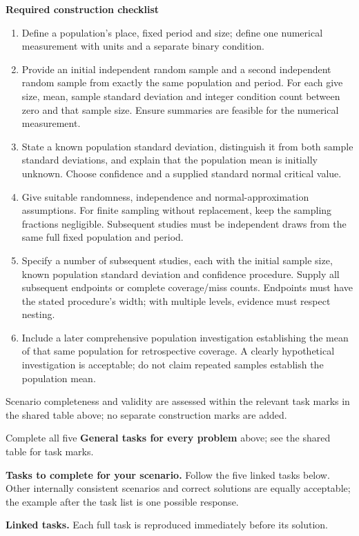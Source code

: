 \textbf{Required construction checklist}
\begin{enumerate}
\item Define a population's place, fixed period and size; define one numerical measurement with units and a separate binary condition.
\item Provide an initial independent random sample and a second independent random sample from exactly the same population and period. For each give size, mean, sample standard deviation and integer condition count between zero and that sample size. Ensure summaries are feasible for the numerical measurement.
\item State a known population standard deviation, distinguish it from both sample standard deviations, and explain that the population mean is initially unknown. Choose confidence and a supplied standard normal critical value.
\item Give suitable randomness, independence and normal-approximation assumptions. For finite sampling without replacement, keep the sampling fractions negligible. Subsequent studies must be independent draws from the same full fixed population and period.
\item Specify a number of subsequent studies, each with the initial sample size, known population standard deviation and confidence procedure. Supply all subsequent endpoints or complete coverage/miss counts. Endpoints must have the stated procedure's width; with multiple levels, evidence must respect nesting.
\item Include a later comprehensive population investigation establishing the mean of that same population for retrospective coverage. A clearly hypothetical investigation is acceptable; do not claim repeated samples establish the population mean.
\end{enumerate}

Scenario completeness and validity are assessed within the relevant task marks in the shared table above; no separate construction marks are added.

Complete all five \textbf{General tasks for every problem} above; see the shared table for task marks.

\textbf{Tasks to complete for your scenario.} Follow the five linked tasks below. Other internally consistent scenarios and correct solutions are equally acceptable; the example after the task list is one possible response.

\clearpage
\textbf{Linked tasks.} Each full task is reproduced immediately before its solution.

